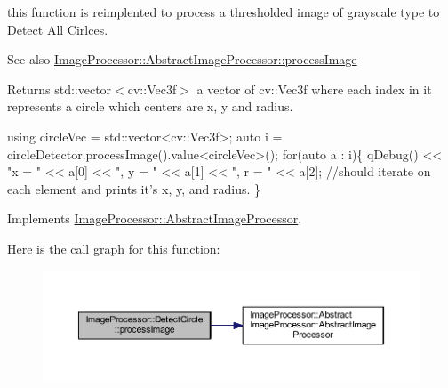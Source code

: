 this function is reimplented to process a thresholded image of grayscale type to Detect All Cirlces. \begin{DoxySeeAlso}{See also}
\hyperlink{class_image_processor_1_1_abstract_image_processor_ad033ae911918b0f6842b7b1d6cdd2b90}{Image\+Processor\+::\+Abstract\+Image\+Processor\+::process\+Image} 
\end{DoxySeeAlso}
\begin{DoxyReturn}{Returns}
std\+::vector$<$cv\+::\+Vec3f$>$ a vector of cv\+::\+Vec3f where each index in it represents a circle which centers are x, y and radius. 
\begin{DoxyCode}
\textcolor{keyword}{using} circleVec = std::vector<cv::Vec3f>;
\textcolor{keyword}{auto} i = circleDetector.processImage().value<circleVec>();
\textcolor{keywordflow}{for}(\textcolor{keyword}{auto} a : i)\{
     qDebug() << \textcolor{stringliteral}{"x = "} << a[0] << \textcolor{stringliteral}{", y = "} << a[1] << \textcolor{stringliteral}{", r = "} << a[2]; \textcolor{comment}{//should iterate on each element
       and prints it's x, y, and radius.}
\}
\end{DoxyCode}
 
\end{DoxyReturn}


Implements \hyperlink{class_image_processor_1_1_abstract_image_processor_ad033ae911918b0f6842b7b1d6cdd2b90}{Image\+Processor\+::\+Abstract\+Image\+Processor}.

Here is the call graph for this function\+:\nopagebreak
\begin{figure}[H]
\begin{center}
\leavevmode
\includegraphics[width=350pt]{d6/d8e/class_image_processor_1_1_detect_circle_ae0c7b4759827b218a03b16567233b4d5_cgraph}
\end{center}
\end{figure}
\mbox{\label{class_image_processor_1_1_detect_circle_ae59a596ca1e992a8d8f859b5f79239f5}} 
